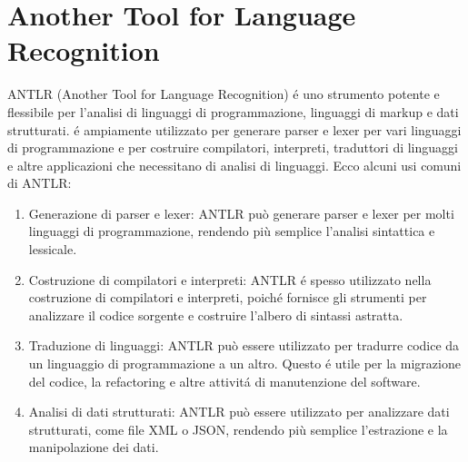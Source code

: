 \documentclass[../../main.tex]{subfiles}
\begin{document}
\section{Another Tool for Language Recognition}
ANTLR (Another Tool for Language Recognition) é uno strumento potente e flessibile per l'analisi di linguaggi di programmazione, linguaggi di markup e dati strutturati. é ampiamente utilizzato per generare parser e lexer per vari linguaggi di programmazione e per costruire compilatori, interpreti, traduttori di linguaggi e altre applicazioni che necessitano di analisi di linguaggi.
Ecco alcuni usi comuni di ANTLR:
\begin{enumerate}
    \item Generazione di parser e lexer: ANTLR può generare parser e lexer per molti linguaggi di programmazione, rendendo più semplice l'analisi sintattica e lessicale.
    \item Costruzione di compilatori e interpreti: ANTLR é spesso utilizzato nella costruzione di compilatori e interpreti, poiché fornisce gli strumenti per analizzare il codice sorgente e costruire l'albero di sintassi astratta.
    \item Traduzione di linguaggi: ANTLR può essere utilizzato per tradurre codice da un linguaggio di programmazione a un altro. Questo é utile per la migrazione del codice, la refactoring e altre attivitá di manutenzione del software.
    \item Analisi di dati strutturati: ANTLR può essere utilizzato per analizzare dati strutturati, come file XML o JSON, rendendo più semplice l'estrazione e la manipolazione dei dati.
\end{enumerate}
\end{document}
